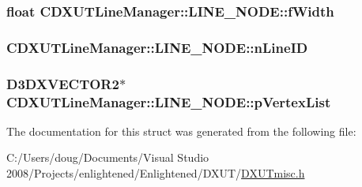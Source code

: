 \label{struct_c_d_x_u_t_line_manager_1_1_l_i_n_e___n_o_d_e_a04167bd21ca4aa7480780e6ded9daa25}
\hypertarget{struct_c_d_x_u_t_line_manager_1_1_l_i_n_e___n_o_d_e_aeaff8df971cd783d13902dbd4297d095}{
\subsubsection[{fWidth}]{\setlength{\rightskip}{0pt plus 5cm}float {\bf CDXUTLineManager::LINE\_\-NODE::fWidth}}}
\label{struct_c_d_x_u_t_line_manager_1_1_l_i_n_e___n_o_d_e_aeaff8df971cd783d13902dbd4297d095}
\hypertarget{struct_c_d_x_u_t_line_manager_1_1_l_i_n_e___n_o_d_e_a8688dc63f9f2bf94da6ff1d580debf99}{
\subsubsection[{nLineID}]{ {\bf CDXUTLineManager::LINE\_\-NODE::nLineID}}}
\label{struct_c_d_x_u_t_line_manager_1_1_l_i_n_e___n_o_d_e_a8688dc63f9f2bf94da6ff1d580debf99}
\hypertarget{struct_c_d_x_u_t_line_manager_1_1_l_i_n_e___n_o_d_e_a2932a50dd89ddd73d3cd6964e0aec83e}{
\subsubsection[{pVertexList}]{\setlength{\rightskip}{0pt plus 5cm}D3DXVECTOR2$\ast$ {\bf CDXUTLineManager::LINE\_\-NODE::pVertexList}}}
\label{struct_c_d_x_u_t_line_manager_1_1_l_i_n_e___n_o_d_e_a2932a50dd89ddd73d3cd6964e0aec83e}


The documentation for this struct was generated from the following file:\begin{DoxyCompactItemize}
\item 
C:/Users/doug/Documents/Visual Studio 2008/Projects/enlightened/Enlightened/DXUT/\hyperlink{_d_x_u_tmisc_8h}{DXUTmisc.h}\end{DoxyCompactItemize}

